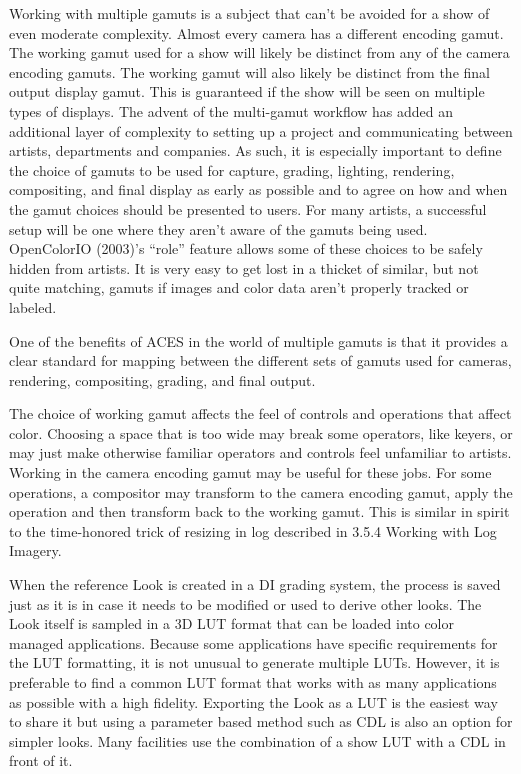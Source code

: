 Working with multiple gamuts is a subject that can’t be avoided for a show of even moderate complexity. Almost every camera has a different encoding gamut. The working gamut used for a show will likely be distinct from any of the camera encoding gamuts. The working gamut will also likely be distinct from the final output display gamut. This is guaranteed if the show will be seen on multiple types of displays. The advent of the multi-gamut workflow has added an additional layer of complexity to setting up a project and communicating between artists, departments and companies. As such, it is especially important to define the choice of gamuts to be used for capture, grading, lighting, rendering, compositing, and final display as early as possible and to agree on how and when the gamut choices should be presented to users. For many artists, a successful setup will be one where they aren’t aware of the gamuts being used. OpenColorIO (2003)’s “role” feature allows some of these choices to be safely hidden from artists. It is very easy to get lost in a thicket of similar, but not quite matching, gamuts if images and color data aren’t properly tracked or labeled.
 
One of the benefits of ACES in the world of multiple gamuts is that it provides a clear standard for mapping between the different sets of gamuts used for cameras, rendering, compositing, grading, and final output.
 
The choice of working gamut affects the feel of controls and operations that affect color. Choosing a space that is too wide may break some operators, like keyers, or may just make otherwise familiar operators and controls feel unfamiliar to artists. Working in the camera encoding gamut may be useful for these jobs. For some operations, a compositor may transform to the camera encoding gamut, apply the operation and then transform back to the working gamut. This is similar in spirit to the time-honored trick of resizing in log described in 3.5.4 Working with Log Imagery.
 
When the reference Look is created in a DI grading system, the process is saved just as it is in case it needs to be modified or used to derive other looks. The Look itself is sampled in a 3D LUT format that can be loaded into color managed applications. Because some applications have specific requirements for the LUT formatting, it is not unusual to generate multiple LUTs. However, it is preferable to find a common LUT format that works with as many applications as possible with a high fidelity. Exporting the Look as a LUT is the easiest way to share it but using a parameter based method such as CDL is also an option for simpler looks. Many facilities use the combination of a show LUT with a CDL in front of it.

